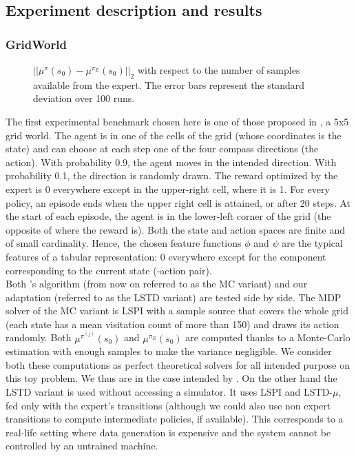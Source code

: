 \documentclass{llncs}
\begin{document}
\subsection{Experiment description and results}
\label{ssec:exp}
\subsubsection{GridWorld}
\begin{figure}
\centering
\resizebox{\columnwidth}{!}{}
\caption{$||\mu^{\pi}(s_0) - \mu^{\pi_E}(s_0)||_2$ with respect to the number of samples available from the expert. The error bars represent the standard deviation over 100 runs.}
\label{fig:E}
\end{figure}
The first experimental benchmark chosen here is one of those proposed in \citep{ng2000algorithms}, a 5x5 grid world. The agent is in one of the cells of the grid (whose coordinates is the state) and can choose at each step one of the four compass directions (the action). With probability 0.9, the agent moves in the intended direction. With probability 0.1, the direction is randomly drawn. The reward optimized by the expert is 0 everywhere except in the upper-right cell, where it is 1. For every policy, an episode ends when the upper right cell is attained, or after 20 steps. At the start of each episode, the agent is in the lower-left corner of the grid (the opposite of where the reward is). Both the state and action spaces are finite and of small cardinality. Hence, the chosen feature functions $\phi$ and $\psi$ are the typical features of a tabular representation: 0 everywhere except for the component corresponding to the current state (-action pair).\\

Both \citet{abbeel2004apprenticeship}'s algorithm (from now on referred to as the MC variant) and our adaptation (referred to as the LSTD variant) are tested side by side. The MDP solver of the MC variant is LSPI with a sample source that covers the whole grid (each state has a mean visitation count of more than 150) and draws its action randomly. Both $\mu^{\pi^{(j)}}(s_0)$ and $\mu^{\pi_E}(s_0)$ are computed thanks to a Monte-Carlo estimation with enough samples to make the variance negligible. We consider both these computations as perfect theoretical solvers for all intended purpose on this toy problem. We thus are in the case intended by \citet{abbeel2004apprenticeship}. On the other hand the LSTD variant is used without accessing a simulator. It uses LSPI and LSTD-$\mu$, fed only with the expert's transitions (although we could also use non expert transitions  to compute intermediate policies, if available). This corresponds to a real-life setting where data generation is expensive and the system cannot be controlled by an untrained machine.\\
\end{document}
